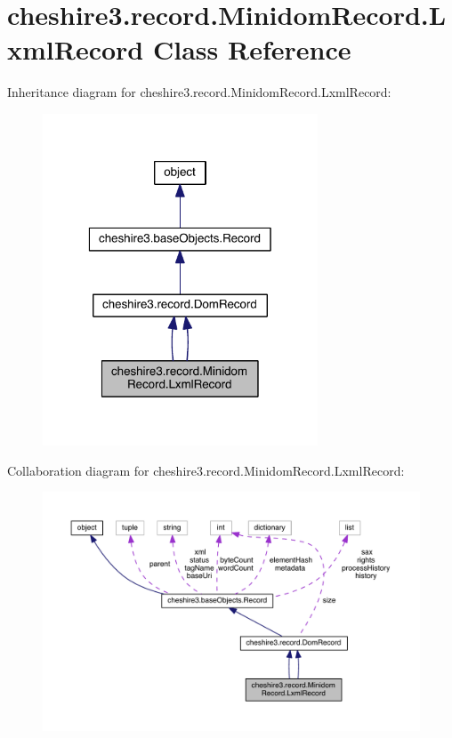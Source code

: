 \hypertarget{classcheshire3_1_1record_1_1_minidom_record_1_1_lxml_record}{\section{cheshire3.\-record.\-Minidom\-Record.\-Lxml\-Record Class Reference}
\label{classcheshire3_1_1record_1_1_minidom_record_1_1_lxml_record}
}


Inheritance diagram for cheshire3.\-record.\-Minidom\-Record.\-Lxml\-Record\-:
\nopagebreak
\begin{figure}[H]
\begin{center}
\leavevmode
\includegraphics[width=232pt]{classcheshire3_1_1record_1_1_minidom_record_1_1_lxml_record__inherit__graph}
\end{center}
\end{figure}


Collaboration diagram for cheshire3.\-record.\-Minidom\-Record.\-Lxml\-Record\-:
\nopagebreak
\begin{figure}[H]
\begin{center}
\leavevmode
\includegraphics[width=350pt]{classcheshire3_1_1record_1_1_minidom_record_1_1_lxml_record__coll__graph}
\end{center}
\end{figure}
